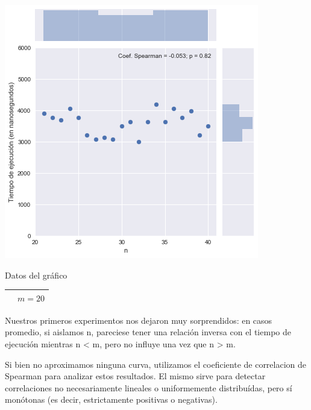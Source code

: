 \begin{minipage}{0.49\textwidth}
    \hfill
    \includegraphics[scale=0.55]{img/greedy-n-hi.png}

    \begin{center}
        Datos del gráfico

        \begin{tabular}{ | l l |}
            \hline
             & $m = 20$ \\
            \hline
        \end{tabular}
    \end{center}
\end{minipage}

Nuestros primeros experimentos nos dejaron muy sorprendidos: en casos promedio, si aislamos n, pareciese tener una relación inversa con el tiempo de ejecución mientras n < m, pero no influye una vez que n > m.

Si bien no aproximamos ninguna curva, utilizamos el coeficiente de correlacion de Spearman para analizar estos resultados. El mismo sirve para detectar correlaciones no necesariamente lineales o uniformemente distribuídas, pero sí monótonas (es decir, estrictamente positivas o negativas).


